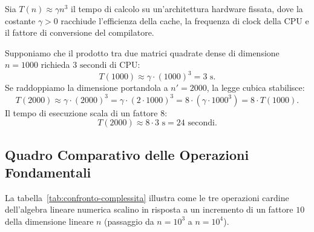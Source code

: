 Sia $T(n) \approx \gamma n^3$ il tempo di calcolo su un'architettura hardware fissata, dove la costante $\gamma > 0$ racchiude l'efficienza della cache, la frequenza di clock della CPU e il fattore di conversione del compilatore.

\begin{example}
Supponiamo che il prodotto tra due matrici quadrate dense di dimensione $n = 1000$ richieda $3\text{ secondi}$ di CPU:
\begin{equation}
    T(1000) \approx \gamma \cdot (1000)^3 = 3\text{ s}.
\end{equation}
Se raddoppiamo la dimensione portandola a $n' = 2000$, la legge cubica stabilisce:
\begin{equation}
    T(2000) \approx \gamma \cdot (2000)^3 = \gamma \cdot (2 \cdot 1000)^3 = 8 \cdot \left(\gamma \cdot 1000^3\right) = 8 \cdot T(1000).
\end{equation}
Il tempo di esecuzione scala di un fattore $8$:
\begin{equation}
    T(2000) \approx 8 \cdot 3\text{ s} = 24\text{ secondi}.
\end{equation}
\end{example}

\subsection{Quadro Comparativo delle Operazioni Fondamentali}

La tabella~\ref{tab:confronto-complessita} illustra come le tre operazioni cardine dell'algebra lineare numerica scalino in risposta a un incremento di un fattore $10$ della dimensione lineare $n$ (passaggio da $n = 10^3$ a $n = 10^4$).

\begin{table}[H]
\centering
{}
\caption{Confronto di complessit\`a computazionale e fattore di scaling per una dilatazione di ordine di grandezza dei dati.}
\label{tab:confronto-complessita}
\end{table}

